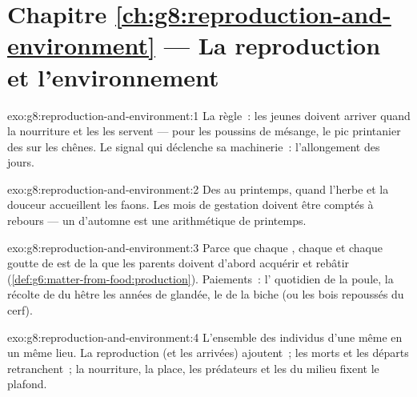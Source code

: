 \section*{Chapitre \ref{ch:g8:reproduction-and-environment} --- La reproduction et l'environnement}

\begin{solution}{exo:g8:reproduction-and-environment:1}
La règle~: les jeunes doivent arriver quand la nourriture et les
 les servent --- pour les poussins de mésange, le pic
printanier des  sur les chênes. Le signal qui déclenche sa
machinerie~: l'allongement des jours.
\end{solution}

\begin{solution}{exo:g8:reproduction-and-environment:2}
Des  au printemps, quand l'herbe et la douceur accueillent
les faons. Les mois de gestation doivent être comptés à rebours ---
un  d'automne est une arithmétique de printemps.
\end{solution}

\begin{solution}{exo:g8:reproduction-and-environment:3}
Parce que chaque , chaque  et chaque goutte de  est de
la  que les parents doivent d'abord acquérir et
rebâtir (\cref{def:g6:matter-from-food:production}). Paiements~:
l' quotidien de la poule, la récolte de  du hêtre les
années de glandée, le  de la biche (ou les bois repoussés du
cerf).
\end{solution}

\begin{solution}{exo:g8:reproduction-and-environment:4}
L'ensemble des individus d'une même  en un même lieu. La
reproduction (et les arrivées) ajoutent~; les morts et les départs
retranchent~; la nourriture, la place, les prédateurs et les
 du milieu fixent le plafond.
\end{solution}

